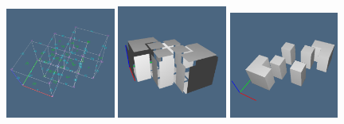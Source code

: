 \documentclass[11pt,oneside]{article}    %
\begin{document}
\begin{figure}[htbp]
   \includegraphics[height=0.332\textwidth,width=0.32\textwidth]{images/test11b1} 
   \includegraphics[height=0.332\textwidth,width=0.32\textwidth]{images/test11b2} 
   \includegraphics[height=0.332\textwidth,width=0.32\textwidth]{images/test11b3} 


\end{figure}
\end{document}
